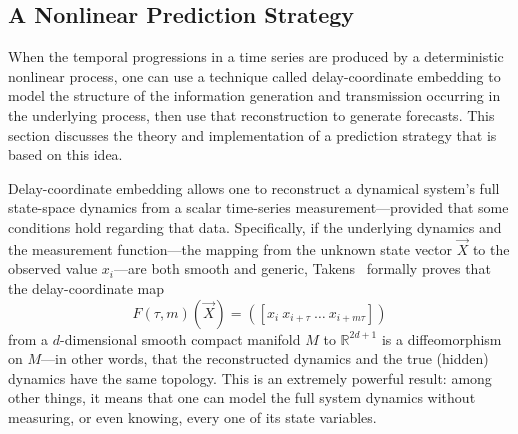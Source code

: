 \subsection{A Nonlinear Prediction Strategy}
\label{sec:lma}

When the temporal progressions in a time series are produced by a
deterministic nonlinear process, one can use a technique called
delay-coordinate embedding
%
%
to model the structure of the information generation and transmission
occurring in the underlying process, then use that reconstruction to
generate forecasts.  This section discusses the theory and
implementation of a prediction strategy that is based on this idea.

Delay-coordinate embedding allows one to reconstruct a dynamical
system's full state-space dynamics from a scalar time-series
measurement---provided that some conditions hold regarding that data.
Specifically, if the underlying dynamics and the measurement
function---the mapping from the unknown state vector $\vec{X}$ to the
observed value $x_i$---are both smooth and generic,
Takens~\cite{takens} formally proves that the delay-coordinate map
\[
F(\tau,m)(\vec{X}) = ([x_{i} ~ x_{i+\tau} ~ \dots ~x_{i+m\tau}])
\]
from a $d$-dimensional smooth compact manifold $M$ to
$\mathbb{R}^{2d+1}$ is a diffeomorphism on $M$---in other words, that
the reconstructed dynamics and the true (hidden) dynamics have the
same topology.  This is an extremely powerful result: among other
things, it means that one can model the full system dynamics without
measuring, or even knowing, every one of its state variables.  

